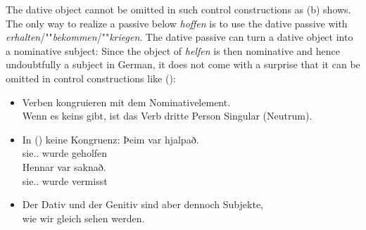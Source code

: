 \eal
{}
\zl
The dative object cannot be omitted in such control constructions as (b) shows. The only way
to realize a passive below \emph{hoffen} is to use the dative passive with
\emph{erhalten}/""\emph{bekommen}/""\emph{kriegen}. The dative passive can turn a dative object into a
nominative subject:
\z
Since the object of \emph{helfen} is then nominative and hence undoubtfully a subject in German, it
does not come with a surprise that it can be omitted in control constructions like ():
\z






\begin{itemize}
\item Verben kongruieren mit dem Nominativelement.\\
      Wenn es keins gibt, ist das Verb dritte Person Singular (Neutrum).


\item In () keine Kongruenz:
\eal
\ex 
\gll Þeim       var hjalpað.\\
     sie.\blau{\PL}.\DAT{} wurde geholfen\\
\ex 
\gll Hennar var saknað.\\
     sie.\blau{\SG}.\GEN{} wurde vermisst\\
\zl


\item Der Dativ und der Genitiv sind aber dennoch Subjekte,\\
      wie wir gleich sehen werden.

\end{itemize}

\fi

